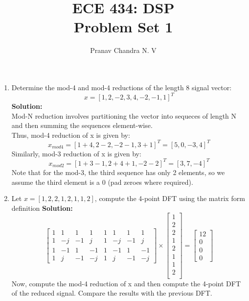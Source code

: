 \documentclass[12pt]{article}
\title{ECE 434: DSP \\ Problem Set 1}
\author{Pranav Chandra N. V}
\begin{document}
	\maketitle

	\begin{enumerate}
		\item Determine the mod-4 and mod-4 reductions of the length 8 signal vector:
			\begin{equation}
				x = [1, 2, -2, 3, 4, -2, -1, 1]^T
			\end{equation}
			\textbf{Solution:}	\\
			Mod-N reduction involves partitioning the vector into sequeces of length N and then summing the sequences element-wise. \\
			Thus, mod-4 reduction of x is given by:
			\begin{equation}
				x_{mod4} = [1+4, 2-2, -2-1, 3+1]^T = [5, 0, -3, 4]^T
			\end{equation}
			Similarly, mod-3 reduction of x is given by:
			\begin{equation}
				x_{mod2} = [1+3-1, 2+4+1, -2-2]^T = [3, 7, -4]^T
			\end{equation}
			Note that for the mod-3, the third sequence has only 2 elements, so we assume the third element is a 0 (pad zeroes where required).

		\item Let $x = [1, 2, 2, 1, 2, 1, 1, 2]$, compute the 4-point DFT using the matrix form definition
		\textbf{Solution:} \\
	\begin{equation}
		\left[
			\begin{matrix}
				1 & 1 & 1 & 1 & 1 & 1 & 1 & 1 \\
				1 & -j&-1&j&1 &-j &-1&  j \\
				1 & -1& 1 &-1&1 & -1& 1 & -1\\
				1 & j & -1& -j&1 & j & -1& -j
			\end{matrix}
		\right]
		\times
		\left[
			\begin{matrix}
			1 \\
			2 \\
			2 \\
			1 \\
			2 \\
			1 \\
			1 \\
			2 \\
			\end{matrix}
		\right]
		=
			\left[
		\begin{matrix}
			12 \\
		0 \\
		0 \\
		0
		\end{matrix}
		\right]
	\end{equation}
	Now, compute the mod-4 reduction of x and then compute the 4-point DFT of the reduced signal. Compare the results with the previous DFT.
	

\end{enumerate}
\end{document}
